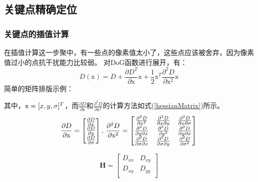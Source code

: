 \documentclass[10.5pt,a4paper]{article}
\numberwithin{equation}{section}
\numberwithin{figure}{section}
\numberwithin{table}{section}
\begin{document}
\subsection{关键点精确定位}
\subsubsection{关键点的插值计算}
在插值计算这一步聚中，有一些点的像素值太小了，这些点应该被舍弃，因为像素值过小的点抗干扰能力比较弱\cite{lowe2004distinctive}。
对DoG函数进行展开，有：
\begin{equation}
\label{taylorD}
D(\mathrm{x}) = D + \frac{\partial{D}^T }{\partial \mathrm{x}} \mathrm{x} + \frac 12 \mathrm{x}^T \frac{\partial^2D}{\partial \mathrm{x}^2}\mathrm{x}
\end{equation}
简单的矩阵排版示例：\par
其中，$\mathrm{x}=[x,y,\sigma]^T$，而$\frac{\partial D }{\partial\mathrm{x} }$和$\frac{\partial^2 D}{\partial \mathrm{x}^2}$的计算方法如式(\ref{hessianMatrix})所示。
\begin{equation}
\label{hessianMatrix}
\frac{\partial D}{\partial\mathrm{x}} = 
\begin{bmatrix}
\frac{\partial D}{\partial x} \\
\frac{\partial D}{\partial y}  \\
\frac{\partial D}{\partial \sigma}  \\
\end{bmatrix}
,\,
\frac{\partial^2 D}{\partial \mathrm{x}^2} = \begin{bmatrix}
\frac{\partial^2 D}{\partial x^2} &\frac{\partial^2 D}{\partial x\partial y}  &\frac{\partial^2 D}{\partial x\partial\sigma} \\
\frac{\partial^2 D}{\partial y\partial x} &\frac{\partial^2 D}{\partial y^2}  &\frac{\partial^2 D}{\partial y\partial\sigma} \\
\frac{\partial^2 D}{\partial\sigma\partial x} &\frac{\partial^2 D}{\partial\sigma\partial y}  &\frac{\partial^2 D}{\partial\sigma^2} \\
\end{bmatrix}
\end{equation}
\par
\begin{equation}
\mathbf{H} = \begin{bmatrix}
D_{xx}  & D_{xy}\\
D_{xy} & D_{yy}\\
\end{bmatrix}
\end{equation}
\end{document}
